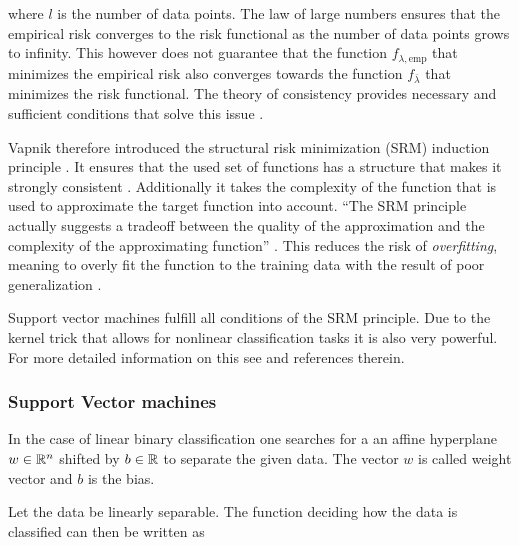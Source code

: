 where \(l\) is the number of data points.
The law of large numbers ensures that the empirical risk converges to the risk functional as the number of data points grows to infinity. This however does not guarantee that the function \(f_{\lambda,\text{emp}}\) that minimizes the empirical risk also converges towards the function \(f_{\bar{\lambda}}\) that minimizes the risk functional.
The theory of consistency provides necessary and sufficient conditions that solve this issue  \cite[p. 989]{Vapnik1999}.

Vapnik therefore introduced the structural risk minimization (SRM) induction principle . It ensures that the used set of functions has a structure that makes it strongly consistent \cite{Vapnik1999}. Additionally it takes the complexity of the function that is used to approximate the target function into account. ``The SRM principle actually suggests a tradeoff between the quality of the approximation and the complexity of the approximating function'' \cite[p. 994]{Vapnik1999}.
This reduces the risk of \emph{overfitting}, meaning to overly fit the function to the training data with the result of poor generalization \cite[chapter 1.3]{Cristianini2000}.


Support vector machines fulfill all conditions of the SRM principle. Due to the kernel trick that allows for nonlinear classification tasks it is also very powerful. For more detailed information on this see \cite{Kunapuli2008} and references therein.

\subsubsection{Support Vector machines}

In the case of linear binary classification one searches for a an affine hyperplane \(w \in \mathbb{R}^n\) shifted by \(b \in \mathbb{R}\) to separate the given data. The vector \(w\) is called weight vector and \(b\) is the bias.

Let the data be linearly separable. The function deciding how the data is classified can then be written as

